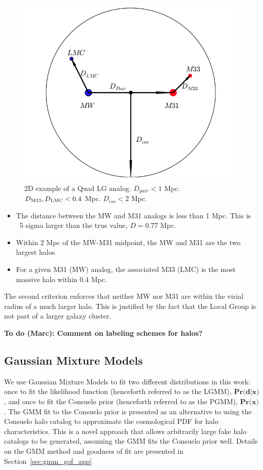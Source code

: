 \documentclass[iop,apj,twocolappendix,numberedappendix]{emulateapj}
\newcommand{\DMEE}{D_{\rm M33}}
\newcommand{\DLMC}{D_{\rm LMC}}
\newcommand{\consuelo}{{\sc Consuelo }}
\def\Sref#1{Section~\ref{#1}}
\newcommand{\todo}[2]{{\bf To do (#1): #2}}
\begin{document}
\begin{figure}[h]
\includegraphics[width=\linewidth]{figures/isd.png}
\caption{2D example of a Quad LG analog. $D_{pair} < 1$ Mpc.  $\DMEE, \DLMC < 0.4$ Mpc.  $D_{iso} < 2$ Mpc.}
\label{fig:iso_diagram}
\end{figure}


\begin{itemize}
\item The distance between the MW and M31 analogs is less than 1 Mpc.  This is ~5 sigma larger than the true value, $D=0.77$ Mpc.
\item Within 2 Mpc of the MW-M31 midpoint, the MW and M31 are the two largest halos.
\item For a given M31 (MW) analog, the associated M33 (LMC) is the most massive halo within 0.4 Mpc.
\end{itemize}
The second criterion enforces that neither MW nor M31 are within the virial radius of a much larger halo.  This is justified by the fact that the Local Group is not part of a larger galaxy cluster. 

\todo{Marc}{Comment on labeling schemes for halos?}




\subsection{Gaussian Mixture Models}
\label{sec:gmm}


We use Gaussian Mixture Models to fit two different distributions in this work: once to fit the likelihood function (henceforth referred to as the LGMM), $\textbf{Pr(d$\vert$x)}$, and once to fit the \consuelo prior (henceforth referred to as the PGMM), $\textbf{Pr(x)}$. 
The GMM fit to the \consuelo prior is presented as an alternative to using the \consuelo halo catalog to approximate the cosmological PDF for halo characteristics. This is a novel approach that allows arbitrarily large fake halo catalogs to be generated, assuming the GMM fits the \consuelo prior well. Details on the GMM method and goodness of fit are presented in 
\Sref{sec:gmm_gof_app} 
\end{document}
